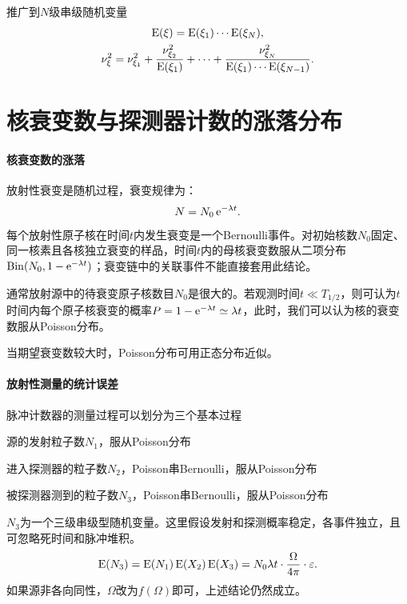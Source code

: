 推广到$N$级串级随机变量
\begin{subequations}\label{eq:nrd-cascade-fluctuations}
	\begin{gather}
		\operatorname{E}(\xi) = \operatorname{E}(\xi_1)\cdots \operatorname{E}(\xi_N),\\
		\nu_\xi^2 = \nu_{\xi_1}^2 + \frac{\nu_{\xi_2}^2}{\operatorname{E}(\xi_1)} + \cdots + \frac{\nu_{\xi_N}^2}{\operatorname{E}(\xi_1)\cdots \operatorname{E}(\xi_{N-1})}.
	\end{gather}
\end{subequations}

\section{核衰变数与探测器计数的涨落分布}

\paragraph{核衰变数的涨落}
放射性衰变是随机过程，衰变规律为：
\[
	N = N_0\mathop{}\!\mathrm{e}^{-\lambda t}.
\]
每个放射性原子核在时间$t$内发生衰变是一个Bernoulli事件。对初始核数$N_0$固定、同一核素且各核独立衰变的样品，时间$t$内的母核衰变数服从二项分布$\operatorname{Bin}(N_0,1 - \mathop{}\!\mathrm{e}^{-\lambda t})$；衰变链中的关联事件不能直接套用此结论。

通常放射源中的待衰变原子核数目$N_0$是很大的。若观测时间$t \ll T_{1/2}$，则可认为$t$时间内每个原子核衰变的概率$P = 1 - \mathop{}\!\mathrm{e}^{-\lambda t} \simeq \lambda t$，此时，我们可以认为核的衰变数服从Poisson分布。

当期望衰变数较大时，Poisson分布可用正态分布近似。
\paragraph{放射性测量的统计误差}
脉冲计数器的测量过程可以划分为三个基本过程
\begin{compactitem}
	\item 源的发射粒子数$N_1$，服从Poisson分布
	\item 进入探测器的粒子数$N_2$，Poisson串Bernoulli，服从Poisson分布
	\item 被探测器测到的粒子数$N_3$，Poisson串Bernoulli，服从Poisson分布
\end{compactitem}
$N_3$为一个三级串级型随机变量。这里假设发射和探测概率稳定，各事件独立，且可忽略死时间和脉冲堆积。
\begin{align}\label{detector-expect}
	\operatorname{E}(N_3) = \operatorname{E}(N_1)\operatorname{E}(X_2)\operatorname{E}(X_3) = N_0\lambda t \cdot \frac{\Omega}{4\pi} \cdot \varepsilon.
\end{align}
如果源非各向同性，$\Omega$改为$f(\Omega)$即可，上述结论仍然成立。%

